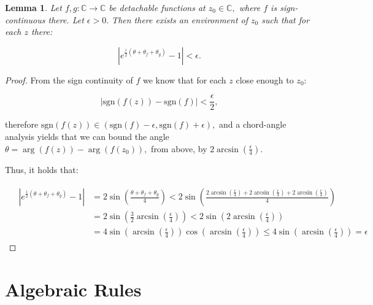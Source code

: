 \documentclass[11pt]{book}
\newtheorem{lem}[thm]{Lemma}
\begin{document}
\begin{lem}\label{theta_theta_fg_upper_bound}Let $f,g:\mathbb{C}\longrightarrow\mathbb{C}$ be detachable functions at $z_{0}\in\mathbb{C},$ where $f$ is sign-continuous there. Let $\epsilon>0.$ Then there exists an environment of $z_{0}$ such that for each $z$ there:

$$\left|e^{\frac{i}{2}\left(\theta+\theta_{f}+\theta_{g}\right)}-1\right|<\epsilon.$$
\end{lem}
\begin{proof}From the sign continuity of $f$ we know that for each $z$ close enough to $z_{0}$:

$$\left|\text{sgn}\left(f\left(z\right)\right)-\text{sgn}\left(f\right)\right|<\frac{\epsilon}{2},$$

therefore $\text{sgn}\left(f\left(z\right)\right)\in\left(\text{sgn}\left(f\right)-\epsilon,\text{sgn}\left(f\right)+\epsilon\right),$ and a chord-angle analysis yields that we can bound the angle $\theta=\arg\left(f\left(z\right)\right)-\arg\left(f\left(z_{0}\right)\right),$ from above, by $2\arcsin\left(\frac{\epsilon}{4}\right).$

Thus, it holds that:


\begin{align}
&\begin{aligned}
\left|e^{\frac{i}{2}\left(\theta+\theta_{f}+\theta_{g}\right)}-1\right| &=2\sin\left(\frac{\theta+\theta_{f}+\theta_{g}}{4}\right)<2\sin\left(\frac{2\arcsin\left(\frac{\epsilon}{4}\right)+2\arcsin\left(\frac{\epsilon}{4}\right)+2\arcsin\left(\frac{\epsilon}{4}\right)}{4}\right) \\
&=2\sin\left(\frac{3}{2}\arcsin\left(\frac{\epsilon}{4}\right)\right)
<2\sin\left(2\arcsin\left(\frac{\epsilon}{4}\right)\right) \\
&=4\sin\left(\arcsin\left(\frac{\epsilon}{4}\right)\right)\cos\left(\arcsin\left(\frac{\epsilon}{4}\right)\right)\leq4\sin\left(\arcsin\left(\frac{\epsilon}{4}\right)\right)=\epsilon
\end{aligned}
\end{align}
\end{proof}

\section{Algebraic Rules}
\end{document}
